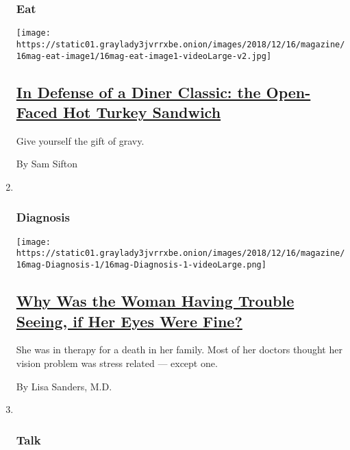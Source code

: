 \begin{enumerate}
{  \subsubsection{Eat}\label{eat}}

  \texttt{[image: https://static01.graylady3jvrrxbe.onion/images/2018/12/16/magazine/16mag-eat-image1/16mag-eat-image1-videoLarge-v2.jpg]}

  \hypertarget{in-defense-of-a-diner-classic-the-open-faced-hot-turkey-sandwich}{%
  \subsection{\texorpdfstring{\href{/2018/12/12/magazine/open-faced-turkey-sandwich-recipe.html}{In
  Defense of a Diner Classic: the Open-Faced Hot Turkey
  Sandwich}}{In Defense of a Diner Classic: the Open-Faced Hot Turkey Sandwich}}\label{in-defense-of-a-diner-classic-the-open-faced-hot-turkey-sandwich}}

  Give yourself the gift of gravy.

  By Sam Sifton
\item ~
  \hypertarget{diagnosis}{%
  \subsubsection{Diagnosis}\label{diagnosis}}

  \texttt{[image: https://static01.graylady3jvrrxbe.onion/images/2018/12/16/magazine/16mag-Diagnosis-1/16mag-Diagnosis-1-videoLarge.png]}

  \hypertarget{why-was-the-woman-having-trouble-seeing-if-her-eyes-were-fine}{%
  \subsection{\texorpdfstring{\href{/2018/12/13/magazine/why-was-the-woman-having-trouble-seeing-if-her-eyes-were-fine.html}{Why
  Was the Woman Having Trouble Seeing, if Her Eyes Were
  Fine?}}{Why Was the Woman Having Trouble Seeing, if Her Eyes Were Fine?}}\label{why-was-the-woman-having-trouble-seeing-if-her-eyes-were-fine}}

  She was in therapy for a death in her family. Most of her doctors
  thought her vision problem was stress related --- except one.

  By Lisa Sanders, M.D.
\item ~
  \hypertarget{talk}{%
  \subsubsection{Talk}\label{talk}}


\end{enumerate}
